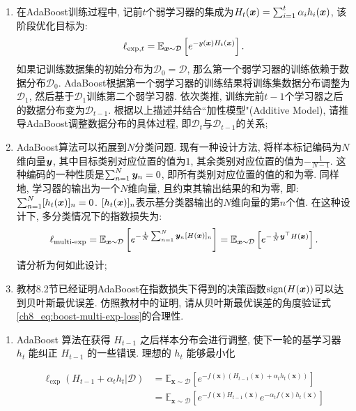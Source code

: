 \documentclass[answers]{exam}  %
\begin{document}
\begin{questions}
  \begin{enumerate}
    \item  在AdaBoost训练过程中, 记前$t$个弱学习器的集成为$H_t({\boldsymbol{x}}) = \sum_{i=1}^t \alpha_i h_i({\boldsymbol{x}})$, 该阶段优化目标为:
          \begin{equation}
            \ell_{\text{exp},t} = \mathbb{E}_{{\boldsymbol{x}} \sim \mathcal{D}}\left[ e^{-y({\boldsymbol{x}})H_t({\boldsymbol{x}})} \right]. \label{ch8_eq:boost-exp-loss}
          \end{equation}
          如果记训练数据集的初始分布为$\mathcal{D}_0=\mathcal{D}$, 那么第一个弱学习器的训练依赖于数据分布$\mathcal{D}_0$. AdaBoost根据第一个弱学习器的训练结果将训练集数据分布调整为$\mathcal{D}_1$, 然后基于$\mathcal{D}_1$训练第二个弱学习器. 依次类推, 训练完前$t-1$个学习器之后的数据分布变为$\mathcal{D}_{t-1}$. 根据以上描述并结合``加性模型"(Additive Model), 请推导AdaBoost调整数据分布的具体过程, 即$\mathcal{D}_t$与$\mathcal{D}_{t-1}$的关系;
    \item AdaBoost算法可以拓展到$N$分类问题. 现有一种设计方法, 将样本标记编码为$N$维向量$\boldsymbol{y}$, 其中目标类别对应位置的值为$1$, 其余类别对应位置的值为$-\frac{1}{N-1}$. 这种编码的一种性质是$\sum_{n=1}^N \boldsymbol{y}_n = 0$, 即所有类别对应位置的值的和为零. 同样地, 学习器的输出为一个$N$维向量, 且约束其输出结果的和为零, 即: $\sum_{n=1}^N [h_t({\boldsymbol{x}})]_n = 0$. $[h_t({\boldsymbol{x}})]_{n}$表示基分类器输出的$N$维向量的第$n$个值. 在这种设计下, 多分类情况下的指数损失为:
          \begin{equation}
            \ell_{\text{multi-exp}} = \mathbb{E}_{{\boldsymbol{x}} \sim \mathcal{D}}\left[  e^{-\frac{1}{N}\sum_{n=1}^N \boldsymbol{y}_n [H({\boldsymbol{x}})]_n} \right] = \mathbb{E}_{{\boldsymbol{x}} \sim \mathcal{D}}\left[  e^{- \frac{1}{N} \boldsymbol{y}^\top H({\boldsymbol{x}})} \right]. \label{ch8_eq:boost-multi-exp-loss}
          \end{equation}
          请分析为何如此设计;
    \item 教材8.2节已经证明AdaBoost在指数损失下得到的决策函数$\text{sign}(H({\boldsymbol{x}}))$可以达到贝叶斯最优误差. 仿照教材中的证明, 请从贝叶斯最优误差的角度验证式\eqref{ch8_eq:boost-multi-exp-loss}的合理性.
  \end{enumerate}

  \begin{solution}
    \begin{enumerate}
      \item

            AdaBoost 算法在获得 $H_{t-1}$ 之后样本分布会进行调整, 使下一轮的基学习器 $h_t$ 能纠正 $H_{t-1}$ 的一些错误. 理想的 $h_{t}$ 能够最小化

            $$
              \begin{aligned}
                \ell_{\exp}(H_{t-1} + \alpha_{t} h_{t} | \mathcal{D}) & = \mathbb{E}_{\bm{x}\sim \mathcal{D}}[e^{-f(\bm{x})(H_{t-1}(\bm{x}) + \alpha_{t}h_{t}(\bm{x}))}]          \\
                                                                      & = \mathbb{E}_{\bm{x}\sim \mathcal{D}}[e^{-f(\bm{x})H_{t-1}(\bm{x})}e^{-\alpha_{t}f(\bm{x})h_{t}(\bm{x})}] \\
              \end{aligned}
            $$


\end{enumerate}
\end{solution}
\end{questions}
\end{document}
